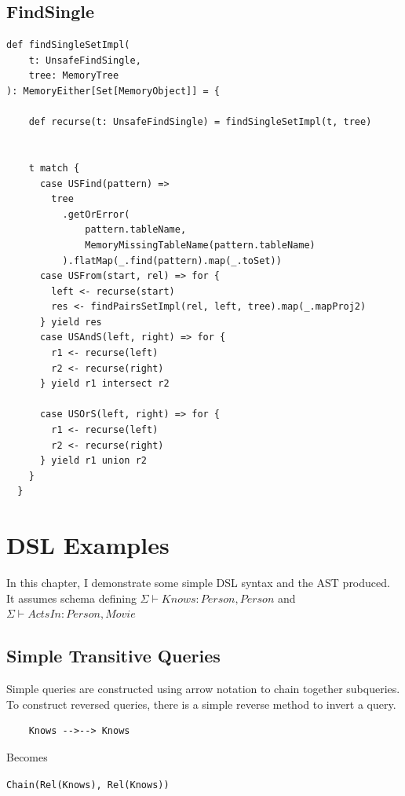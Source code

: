 \documentclass[12pt,a4paper,twoside,openright]{report}
\newcommand\codeName[1]{\texttt{#1}}
\newcommand{\typeRule}[2]{\Sigma\vdash #1 \colon #2}
\renewcommand{\baselinestretch}{1.1}    %
\begin{document}
\renewcommand{\baselinestretch}{1.1}

\section{FindSingle}
\renewcommand{\baselinestretch}{0.8}
\begin{framed}
\begin{verbatim}
def findSingleSetImpl(
    t: UnsafeFindSingle,
    tree: MemoryTree
): MemoryEither[Set[MemoryObject]] = {

    def recurse(t: UnsafeFindSingle) = findSingleSetImpl(t, tree)


    t match {
      case USFind(pattern) =>
        tree
          .getOrError(
              pattern.tableName,
              MemoryMissingTableName(pattern.tableName)
          ).flatMap(_.find(pattern).map(_.toSet))
      case USFrom(start, rel) => for {
        left <- recurse(start)
        res <- findPairsSetImpl(rel, left, tree).map(_.mapProj2)
      } yield res
      case USAndS(left, right) => for {
        r1 <- recurse(left)
        r2 <- recurse(right)
      } yield r1 intersect r2

      case USOrS(left, right) => for {
        r1 <- recurse(left)
        r2 <- recurse(right)
      } yield r1 union r2
    }
  }
\end{verbatim}
\end{framed}
\renewcommand{\baselinestretch}{1.1}

\chapter{DSL Examples}
\label{DSLExamples}
In this chapter, I demonstrate some simple DSL syntax and the AST produced. It assumes schema defining $\typeRule{Knows}{Person, Person}$ and $\typeRule{ActsIn}{Person, Movie}$
\section{Simple Transitive Queries}
Simple queries are constructed using arrow notation to chain together subqueries. To construct reversed queries, there is a simple reverse method to invert a query.

\renewcommand{\baselinestretch}{0.8}
\begin{framed}
\begin{framed}
\begin{verbatim}
 	Knows -->--> Knows 
\end{verbatim}
\end{framed}
Becomes
\begin{framed}
\codeName{Chain(Rel(Knows), Rel(Knows))}
\end{framed}
\end{framed}
\renewcommand{\baselinestretch}{1.1}
\end{document}
